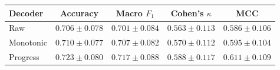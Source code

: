 \begin{tabular}{lcccc}
\toprule
Decoder & Accuracy & Macro $F_1$ & Cohen's $\kappa$ & MCC \\
\midrule
Raw & $0.706 \pm 0.078$ & $0.701 \pm 0.084$ & $0.563 \pm 0.113$ & $0.586 \pm 0.106$ \\
Monotonic & $0.710 \pm 0.077$ & $0.707 \pm 0.082$ & $0.570 \pm 0.112$ & $0.595 \pm 0.104$ \\
Progress & $0.723 \pm 0.080$ & $0.717 \pm 0.088$ & $0.588 \pm 0.117$ & $0.611 \pm 0.109$ \\
\bottomrule
\end{tabular}
